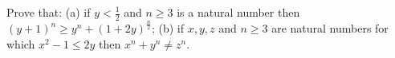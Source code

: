 Prove that:
(a) if $y<\frac12$ and $n\ge3$ is a natural number then $(y+1)^n\ge y^n+(1+2y)^\frac n2$;
(b) if $x,y,z$ and $n\ge3$ are natural numbers for which $x^2-1\le2y$ then $x^n+y^n\ne z^n$.